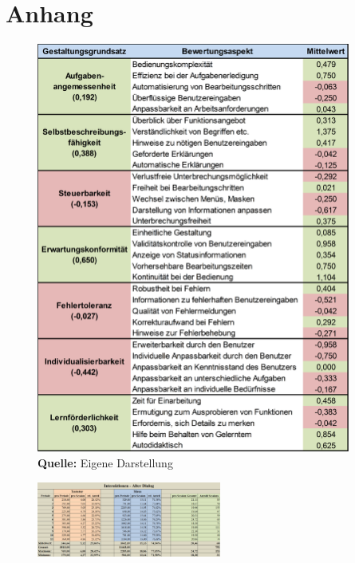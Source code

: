 \section*{Anhang}

\anhangsverzeichnis

\begin{minipage}{\textwidth}
    \begin{figure}[H]
      \centering
      \includegraphics[width=390px]{img/Auswertungsmatrix_Alter_Dialog.PNG}
      \caption*{\textbf{Quelle:} Eigene Darstellung}
      \label{fig:auswertungsmatrixAlterDialog}
    \end{figure}
\end{minipage}

\label{sec:datentabelleAlterDialog}
\begin{figure}[H]
    \begin{minipage}[H]{1\textwidth}	
        \centering
         \includegraphics[angle=90, width=0.54\textwidth]{img/Datentabelle_Alter_Dialog}
        \label{fig:datentabelleAlterDialog}
    \end{minipage}
\end{figure}

